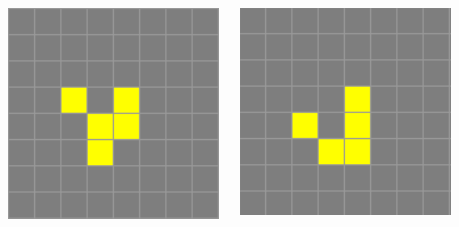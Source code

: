 \documentclass[20pt,margin=2.2cm,innermargin=-4.5in,blockverticalspace=-0.25in]{tikzposter}
\begin{document}
\begin{columns}
{\begin{minipage}[t]{\linewidth}
\begin{minipage}[t]{0.15\linewidth}
                \includegraphics[width=\textwidth]{images/life-glider-2.png}
            \end{minipage}
            \begin{minipage}[t]{0.15\linewidth}
                \includegraphics[width=\textwidth]{images/life-glider-3.png}

\end{minipage}
\end{minipage}}
\end{columns}
\end{document}
